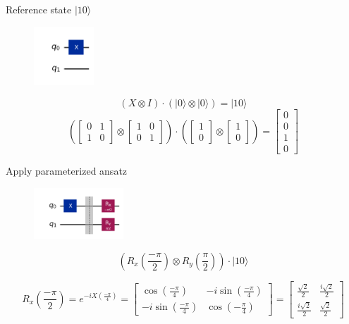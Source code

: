 \documentclass{article}
\begin{document}
Reference state \(|10 \rangle\)
\begin{figure}[H]
	\centering
	\includegraphics[width=0.2\textwidth, height=0.2\textheight]{ref.png}
\end{figure}
\[
	\left( X \otimes I\right) \cdot \left( |0 \rangle \otimes | 0 \rangle \right) = |10 \rangle
\]
\[
	\left(
	\begin{bmatrix}
			0 & 1 \\
			1 & 0
		\end{bmatrix}
	\otimes
	\begin{bmatrix}
			1 & 0 \\
			0 & 1
		\end{bmatrix}
	\right)
	\cdot
	\left(
	\begin{bmatrix}
			1 \\
			0
		\end{bmatrix}
	\otimes
	\begin{bmatrix}
			1 \\
			0
		\end{bmatrix}
	\right)
	=
	\begin{bmatrix}
		0 \\
		0 \\
		1 \\
		0
	\end{bmatrix}
\]

Apply parameterized ansatz
\begin{figure}[H]
	\centering
	\includegraphics[width=0.3\textwidth, height=0.15\textheight]{ansatz1.png}
\end{figure}
\[
	\left(R_x(\frac{-\pi}{2}) \otimes R_y(\frac{\pi}{2})\right) \cdot |10 \rangle
\]

\[
	R_x(\frac{-\pi}{2}) = e^{-i X (\frac{-\pi}{4})} = \begin{bmatrix}
		\cos(\frac{-\pi}{4})   & -i\sin(\frac{-\pi}{4}) \\
		-i\sin(\frac{-\pi}{4}) & \cos(-\frac{\pi}{4})
	\end{bmatrix}
	=
	\begin{bmatrix}
		\frac{\sqrt{2}}{2}   & \frac{i \sqrt{2}}{2} \\
		\frac{i \sqrt{2}}{2} & \frac{\sqrt{2}}{2}
	\end{bmatrix}
\]
\end{document}
